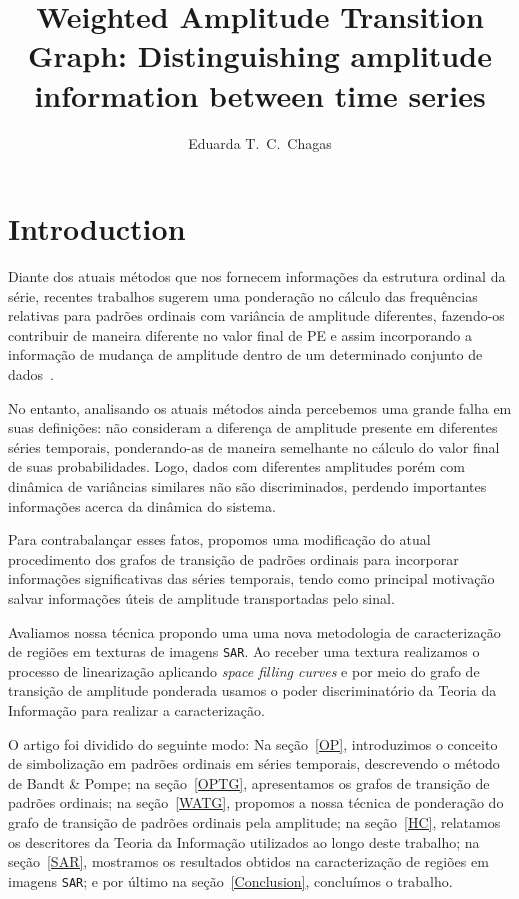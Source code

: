 \documentclass[12pt]{article}
\title{Weighted Amplitude Transition Graph: Distinguishing amplitude information between time series}
\author{Eduarda T.\ C.\ Chagas\inst{1}}
\begin{document}
\maketitle

\section{Introduction}\label{Intro}

Diante dos atuais métodos que nos fornecem informações da estrutura ordinal da série, recentes trabalhos sugerem uma ponderação no cálculo das frequências relativas para padrões ordinais com variância de amplitude diferentes, fazendo-os contribuir de maneira diferente no valor final de PE e assim incorporando a informação de mudança de amplitude dentro de um determinado conjunto de dados~\citep{Fadlallah2013Weightedpermutation}.

No entanto, analisando os atuais métodos ainda percebemos uma grande falha em suas definições: não consideram a diferença de amplitude presente em diferentes séries temporais, ponderando-as de maneira semelhante no cálculo do valor final de suas probabilidades.
Logo, dados com diferentes amplitudes porém com dinâmica de variâncias similares não são discriminados, perdendo importantes informações acerca da dinâmica do sistema.

Para contrabalançar esses fatos, propomos uma modificação do atual procedimento dos grafos de transição de padrões ordinais para incorporar informações significativas das séries temporais, tendo como principal motivação salvar informações úteis de amplitude transportadas pelo sinal.

Avaliamos nossa técnica propondo uma uma nova metodologia de caracterização de regiões em texturas de imagens \texttt{SAR}. 
Ao receber uma textura realizamos o processo de linearização aplicando \textit{space filling curves} e por meio do grafo de transição de amplitude ponderada usamos o poder discriminatório da Teoria da Informação para realizar a caracterização.

O artigo foi dividido do seguinte modo: 
Na seção~\ref{OP}, introduzimos o conceito de simbolização em padrões ordinais em séries temporais, descrevendo o método de Bandt \& Pompe; 
na seção~\ref{OPTG}, apresentamos os grafos de transição de padrões ordinais;
na seção~\ref{WATG}, propomos a nossa técnica de ponderação do grafo de transição de padrões ordinais pela amplitude;
na seção~\ref{HC}, relatamos os descritores da Teoria da Informação utilizados ao longo deste trabalho;
na seção~\ref{SAR}, mostramos os resultados obtidos na caracterização de regiões em imagens \texttt{SAR};
e por último na seção~\ref{Conclusion}, concluímos o trabalho.
\end{document}
